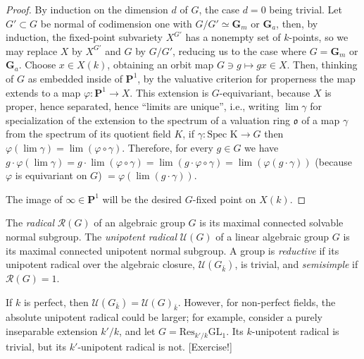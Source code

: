 \begin{proof}
 By induction on the dimension $d$ of $G$, the case $d=0$ being trivial. Let $G'\subset G$ be normal of codimension one with $G/G'\simeq \mathbf G_m$ or $\mathbf G_a$, then, by induction, the fixed-point subvariety $X^{G'}$ has a nonempty set of $k$-points, so we may replace $X$ by $X^{G'}$ and $G$ by $G/G'$, reducing us to the case where $G=\mathbf G_m$ or $\mathbf G_a$. Choose $x\in X(k)$, obtaining an orbit map $G\ni g\mapsto gx\in X$.  Then, thinking of $G$ as embedded inside of $\mathbf P^1$, by the valuative criterion for properness the map extends to a map $\varphi:\mathbf P^1\to X$. This extension is $G$-equivariant, because $X$ is proper, hence separated, hence ``limits are unique'', i.e., writing $\lim \gamma$ for specialization of the extension to the spectrum of a valuation ring $\mathfrak o$ of a map $\gamma$ from the spectrum of its quotient field $K$, if $\gamma: \text{Spec K} \to G$ then $\varphi(\lim \gamma) = \lim (\varphi \circ \gamma)$. Therefore, for every $g\in G$ we have $g\cdot \varphi(\lim \gamma) = g\cdot \lim (\varphi\circ\gamma) = \lim( g\cdot \varphi\circ\gamma) = \lim(\varphi(g\cdot \gamma))$ (because $\varphi$ is equivariant on $G$) $= \varphi(\lim (g\cdot\gamma))$. 
 
 The image of $\infty\in \mathbf P^1$ will be the desired $G$-fixed point on $X(k)$.
\end{proof}




\begin{definition}
\label{definition-reductive}
The {\it radical} $\mathcal R(G)$ of an algebraic group $G$ is its maximal connected solvable normal subgroup. The {\it unipotent radical} $\mathcal U(G)$ of a linear algebraic group $G$ is its maximal connected unipotent normal subgroup. A group is {\it reductive} if its unipotent radical over the algebraic closure, $\mathcal U(G_{\bar k})$, is trivial, and {\it semisimple} if $\mathcal R(G)=1$.
\end{definition}

\begin{remark}
 \label{remark-unipotent-radical}
If $k$ is perfect, then $\mathcal U(G_{\bar k}) = \mathcal U(G)_{\bar k}$. However, for non-perfect fields, the absolute unipotent radical could be larger; for example, consider a purely inseparable extension $k'/k$, and let $G = \text{Res}_{k'/k}\text{GL}_1$. Its $k$-unipotent radical is trivial, but its $k'$-unipotent radical is not. [Exercise!]
\end{remark}



